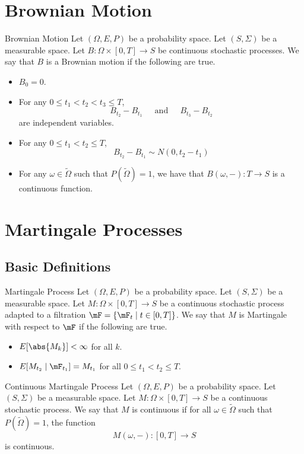 \documentclass[a4paper]{article}
\begin{document}
\pagebreak
\section{Brownian Motion}
\begin{defn}{Brownian Motion}{} Let $(\Omega,E,P)$ be a probability space. Let $(S,\Sigma)$ be a measurable space. Let $B:\Omega\times[0,T]\to S$ be continuous stochastic processes. We say that $B$ is a Brownian motion if the following are true. 
\begin{itemize}
\item $B_0=0$. 
\item For any $0\leq t_1<t_2<t_3\leq T$, $$B_{t_2}-B_{t_1}\;\;\;\;\text{ and }\;\;\;\;B_{t_3}-B_{t_2}$$ are independent variables. 
\item For any $0\leq t_1<t_2\leq T$, $$B_{t_2}-B_{t_1}\sim N(0,t_2-t_1)$$
\item For any $\omega\in\widetilde{\Omega}$ such that $P(\widetilde{\Omega})=1$, we have that $B(\omega,-):T\to S$ is a continuous function. 
\end{itemize}
\end{defn}

\pagebreak
\section{Martingale Processes}
\subsection{Basic Definitions}
\begin{defn}{Martingale Process}{} Let $(\Omega,E,P)$ be a probability space. Let $(S,\Sigma)$ be a measurable space. Let $M:\Omega\times[0,T]\to S$ be a continuous stochastic process adapted to a filtration $\mF=\{\mF_t\;|\;t\in[0,T]\}$. We say that $M$ is Martingale with respect to $\mF$ if the following are true. 
\begin{itemize}
\item $E[\abs{M_k}]<\infty$ for all $k$. 
\item $E[M_{t_2}\;|\;\mF_{t_1}]=M_{t_1}$ for all $0\leq t_1<t_2\leq T$. 
\end{itemize}
\end{defn}

\begin{defn}{Continuous Martingale Process}{} Let $(\Omega,E,P)$ be a probability space. Let $(S,\Sigma)$ be a measurable space. Let $M:\Omega\times[0,T]\to S$ be a continuous stochastic process. We say that $M$ is continuous if for all $\omega\in\widetilde{\Omega}$ such that $P(\widetilde{\Omega})=1$, the function $$M(\omega,-):[0,T]\to S$$ is continuous. 
\end{defn}
\end{document}
